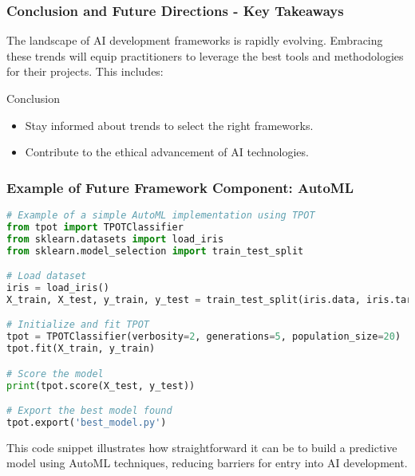 \documentclass{beamer}
\begin{document}
\begin{frame}[fragile]
    \frametitle{Conclusion and Future Directions - Key Takeaways}
    The landscape of AI development frameworks is rapidly evolving. Embracing these trends will equip practitioners to leverage the best tools and methodologies for their projects. This includes:
    
    \begin{block}{Conclusion}
        \begin{itemize}
            \item Stay informed about trends to select the right frameworks.
            \item Contribute to the ethical advancement of AI technologies.
        \end{itemize}
    \end{block}
\end{frame}

\begin{frame}[fragile]
    \frametitle{Example of Future Framework Component: AutoML}
    \begin{lstlisting}[language=Python]
# Example of a simple AutoML implementation using TPOT
from tpot import TPOTClassifier
from sklearn.datasets import load_iris
from sklearn.model_selection import train_test_split

# Load dataset
iris = load_iris()
X_train, X_test, y_train, y_test = train_test_split(iris.data, iris.target, random_state=42)

# Initialize and fit TPOT
tpot = TPOTClassifier(verbosity=2, generations=5, population_size=20)
tpot.fit(X_train, y_train)

# Score the model
print(tpot.score(X_test, y_test))

# Export the best model found
tpot.export('best_model.py')
    \end{lstlisting}
    This code snippet illustrates how straightforward it can be to build a predictive model using AutoML techniques, reducing barriers for entry into AI development.
\end{frame}
\end{document}
